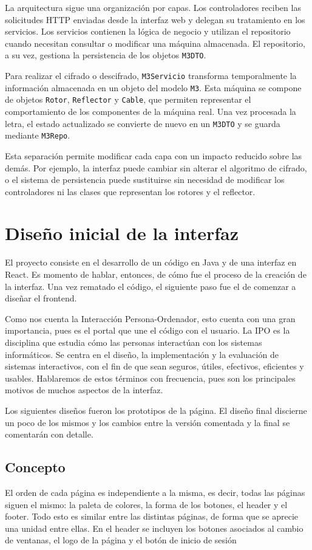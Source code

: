 La arquitectura sigue una organización por capas. Los controladores reciben las solicitudes HTTP enviadas desde la interfaz web y delegan su tratamiento en los servicios. Los servicios contienen la lógica de negocio y utilizan el repositorio cuando necesitan consultar o modificar una máquina almacenada. El repositorio, a su vez, gestiona la persistencia de los objetos \texttt{M3DTO}.

Para realizar el cifrado o descifrado, \texttt{M3Servicio} transforma temporalmente la información almacenada en un objeto del modelo \texttt{M3}. Esta máquina se compone de objetos \texttt{Rotor}, \texttt{Reflector} y \texttt{Cable}, que permiten representar el comportamiento de los componentes de la máquina real. Una vez procesada la letra, el estado actualizado se convierte de nuevo en un \texttt{M3DTO} y se guarda mediante \texttt{M3Repo}.

Esta separación permite modificar cada capa con un impacto reducido sobre las demás. Por ejemplo, la interfaz puede cambiar sin alterar el algoritmo de cifrado, o el sistema de persistencia puede sustituirse sin necesidad de modificar los controladores ni las clases que representan los rotores y el reflector.

\section {Diseño inicial de la interfaz}

El proyecto consiste en el desarrollo de un código en Java y de una interfaz en React. Es momento de hablar, entonces, de cómo fue el proceso de la creación de la interfaz. Una vez rematado el código, el siguiente paso fue el de comenzar a diseñar el frontend. 

Como nos cuenta la Interacción Persona-Ordenador, esto cuenta con una gran importancia, pues es el portal que une el código con el usuario. La IPO es la disciplina que estudia cómo las personas interactúan con los sistemas informáticos. Se centra en el diseño, la implementación y la evaluación de sistemas interactivos, con el fin de que sean seguros, útiles, efectivos, eficientes y usables. Hablaremos de estos términos con frecuencia, pues son los principales motivos de muchos aspectos de la interfaz.

Los siguientes diseños fueron los prototipos de la página. El diseño final discierne un poco de los mismos y los cambios entre la versión comentada y la final se comentarán con detalle. 

\subsection{Concepto}
El orden de cada página es independiente a la misma, es decir, todas las páginas siguen el mismo: la paleta de colores, la forma de los botones, el header y el footer. Todo esto es similar entre las distintas páginas, de forma que se aprecie una unidad entre ellas. 
En el header se incluyen los botones asociados al cambio de ventanas, el logo de la página y el botón de inicio de sesión

